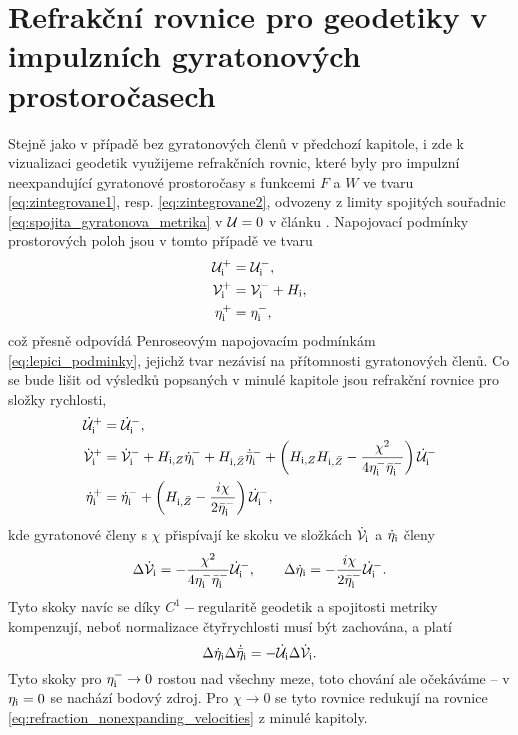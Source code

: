 \section{Refrakční rovnice pro geodetiky v impulzních gyratonových prostoročasech}
Stejně jako v případě bez gyratonových členů v předchozí kapitole, i zde k vizualizaci geodetik využijeme refrakčních rovnic,
které byly pro impulzní neexpandující gyratonové prostoročasy s funkcemi $F$ a $W$ ve tvaru
\eqref{eq:zintegrovane1}, resp. \eqref{eq:zintegrovane2}, odvozeny z limity spojitých souřadnic \eqref{eq:spojita_gyratonova_metrika}
v $\mathcal{U} = 0$ v článku \cite{Podolsky_2017}.
Napojovací podmínky prostorových poloh jsou v tomto případě ve tvaru
\begin{equation}
    \label{eq:refrakcni_rovnice_gyra_polohy}
    \begin{split}
        \mathcal{U}_{\mathrm{i}}^{+} &= \mathcal{U}_{\mathrm{i}}^{-}, \\
        \mathcal{V}_{\mathrm{i}}^{+} &= \mathcal{V}_{\mathrm{i}}^{-} + H_{\mathrm{i}}, \\
        \eta_{\mathrm{i}}^{+} &= \eta_{\mathrm{i}}^{-},
    \end{split}
\end{equation}
což přesně odpovídá Penroseovým napojovacím podmínkám \eqref{eq:lepici_podminky},
jejichž tvar nezávisí na přítomnosti gyratonových členů. Co se bude lišit od
výsledků popsaných v minulé kapitole jsou refrakční rovnice pro složky rychlosti,
\begin{equation}
    \label{eq:refrakcni_rovnice_gyra_rychlosti}
    \begin{split}
        \dot{\mathcal{U}}_{\mathrm{i}}^{+} &= \dot{\mathcal{U}}_{\mathrm{i}}^{-}, \\
        \dot{\mathcal{V}}_{\mathrm{i}}^{+} &= \dot{\mathcal{V}}_{\mathrm{i}}^{-} + H_{\mathrm{i}, Z} \dot{\eta}_{\mathrm{i}}^{-} + H_{\mathrm{i}, \bar{Z}} \dot{\bar{\eta}}_{\mathrm{i}}^{-} + \left(H_{\mathrm{i}, Z} H_{\mathrm{i}, \bar{Z}} - \frac{\chi^2}{4 \eta_{\mathrm{i}}^{-} \bar{\eta}_{\mathrm{i}}^{-}}\right) \dot{\mathcal{U}}_{\mathrm{i}}^{-} \\
        \dot{\eta}_{\mathrm{i}}^{+} &= \dot{\eta}_{\mathrm{i}}^{-} + \left(H_{\mathrm{i}, \bar{Z}} - \frac{i \chi}{2 \bar{\eta}_{\mathrm{i}}^{-}}\right) \dot{\mathcal{U}}_{\mathrm{i}}^{-},
    \end{split} 
\end{equation}
kde gyratonové členy s $\chi$ přispívají ke skoku ve složkách $\dot{\mathcal{V}}_{\mathrm{i}}$ a $\dot{\eta}_{\mathrm{i}}$ členy
\begin{equation}
    \Delta \dot{\mathcal{V}}_{\mathrm{i}} = -\frac{\chi^2}{4 \eta_{\mathrm{i}}^{-} \bar{\eta}_{\mathrm{i}}^{-}} \dot{\mathcal{U}}_{\mathrm{i}}^{-}, ~~~~~~ \Delta \dot{\eta}_{\mathrm{i}} = -\frac{i \chi}{2 \bar{\eta}_{\mathrm{i}}^{-}} \dot{\mathcal{U}}_{\mathrm{i}}^{-}.
\end{equation}
Tyto skoky navíc se díky $C^1-$regularitě geodetik a spojitosti metriky kompenzují, neboť normalizace čtyřrychlosti musí být zachována, a platí
\begin{equation}
    \Delta \dot{\eta}_{\mathrm{i}} \Delta \dot{\bar{\eta}}_{\mathrm{i}} = - \dot{\mathcal{U}}_{\mathrm{i}} \Delta \dot{\mathcal{V}}_{\mathrm{i}}.
\end{equation}
Tyto skoky pro $\eta_{\mathrm{i}}^{-} \to 0$ rostou nad všechny meze, toto chování ale očekáváme -- v $\eta_{\mathrm{i}} = 0$ se nachází bodový zdroj.
Pro $\chi \to 0$ se tyto rovnice redukují na rovnice \eqref{eq:refraction_nonexpanding_velocities} z minulé kapitoly.

